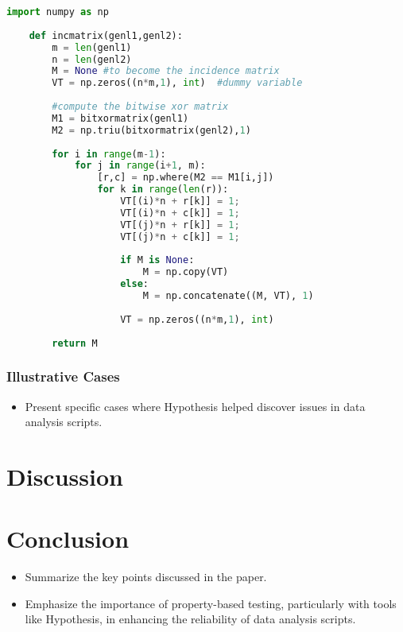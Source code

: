 \documentclass[runningheads]{llncs}
\begin{document}
\begin{lstlisting}[language=Python]
    import numpy as np
        
    def incmatrix(genl1,genl2):
        m = len(genl1)
        n = len(genl2)
        M = None #to become the incidence matrix
        VT = np.zeros((n*m,1), int)  #dummy variable
        
        #compute the bitwise xor matrix
        M1 = bitxormatrix(genl1)
        M2 = np.triu(bitxormatrix(genl2),1) 
    
        for i in range(m-1):
            for j in range(i+1, m):
                [r,c] = np.where(M2 == M1[i,j])
                for k in range(len(r)):
                    VT[(i)*n + r[k]] = 1;
                    VT[(i)*n + c[k]] = 1;
                    VT[(j)*n + r[k]] = 1;
                    VT[(j)*n + c[k]] = 1;
                    
                    if M is None:
                        M = np.copy(VT)
                    else:
                        M = np.concatenate((M, VT), 1)
                    
                    VT = np.zeros((n*m,1), int)
        
        return M
\end{lstlisting}

\subsubsection{Illustrative Cases}
\begin{itemize}
  \item Present specific cases where Hypothesis helped discover issues in data analysis scripts.
\end{itemize}

\section{Discussion}

\section{Conclusion}
\begin{itemize}
  \item Summarize the key points discussed in the paper.
  \item Emphasize the importance of property-based testing, particularly with tools like Hypothesis, in enhancing the reliability of data analysis scripts.
\end{itemize}
%
%
%


\end{document}
